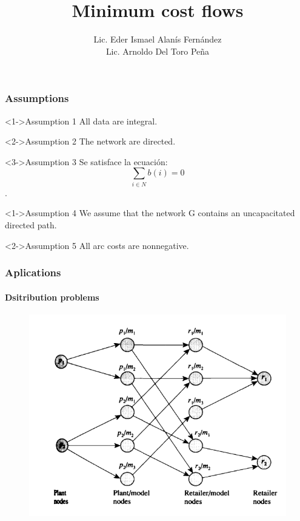 \documentclass{beamer}
\title{Minimum cost flows}
\author{Lic. Eder Ismael Alanís Fernández\\ Lic. Arnoldo Del Toro Peña }
\institute{Universidad Autónoma de Nuevo León}
\begin{document}
\begin{frame}
 \titlepage
\end{frame}

\begin{frame}
 \frametitle{Assumptions}
\begin{block}<1->{Assumption 1}
All data are integral.
\end{block}

\begin{block}<2->{Assumption 2}
The network are directed.
\end{block}

\begin{block}<3->{Assumption 3}
  Se satisface la ecuación: $$\sum_{i \in N} {b(i)} = 0$$.
  \end{block}
\end{frame}

\begin{frame}
  \begin{block}<1->{Assumption 4}
    We assume that the network G contains an uncapacitated
    directed path.
  \end{block}
  \begin{block}<2->{Assumption 5}
    All arc costs are nonnegative.
  \end{block}
    
\end{frame}

\begin{frame}
\frametitle{Aplications}
\framesubtitle{Dsitribution problems}
\begin{figure}[h!t]
\centering
\includegraphics[scale = 0.4 ]{distributionproblem.png}
\end{figure}
\end{frame}
\end{document}
